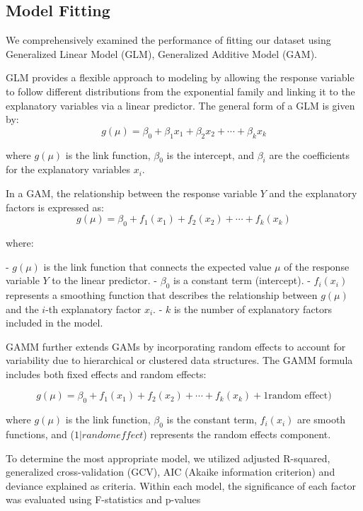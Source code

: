 \documentclass{article}
\begin{document}
\subsection{Model Fitting}

We comprehensively examined the performance of fitting our dataset using Generalized Linear Model (GLM), Generalized Additive Model (GAM).

GLM \cite{mccullagh2019generalized} provides a flexible approach to modeling by allowing the response variable to follow different distributions from the exponential family and linking it to the explanatory variables via a linear predictor. The general form of a GLM is given by:
\[
g(\mu) = \beta_0 + \beta_1 x_1 + \beta_2 x_2 + \cdots + \beta_k x_k 
\]

where $g(\mu)$ is the link function, $\beta_0$ is the intercept, and $\beta_i$ are the coefficients for the explanatory variables $x_i$.

In a GAM\cite{guisan2002generalized}, the relationship between the response variable  $Y  $ and the explanatory factors is expressed as:
\[
g(\mu) = \beta_0 + f_1(x_1) + f_2(x_2) + \cdots + f_k(x_k)
\]

where:

-  $g(\mu)  $ is the link function that connects the expected value  $\mu  $ of the response variable  $Y  $ to the linear predictor.
-  $\beta_0  $ is a constant term (intercept).
-  $f_i(x_i)  $ represents a smoothing function that describes the relationship between  $g(\mu)  $ and the  $i  $-th explanatory factor  $x_i  $.
-  $k  $ is the number of explanatory factors included in the model.

GAMM further extends GAMs by incorporating random effects to account for variability due to hierarchical or clustered data structures. The GAMM formula includes both fixed effects and random effects:

\[
g(\mu) = \beta_0 + f_1(x_1) + f_2(x_2) + \cdots + f_k(x_k) + 1 \text{random effect}) 
\]

where $g(\mu)$ is the link function, $\beta_0$ is the constant term, $f_i(x_i )$ are smooth functions, and ($1|random effect$) represents the random effects component.


To determine the most appropriate model, we utilized adjusted R-squared, generalized cross-validation (GCV),  AIC (Akaike information criterion) and deviance explained as criteria. Within each model, the significance of each factor was evaluated using F-statistics and p-values
\end{document}

